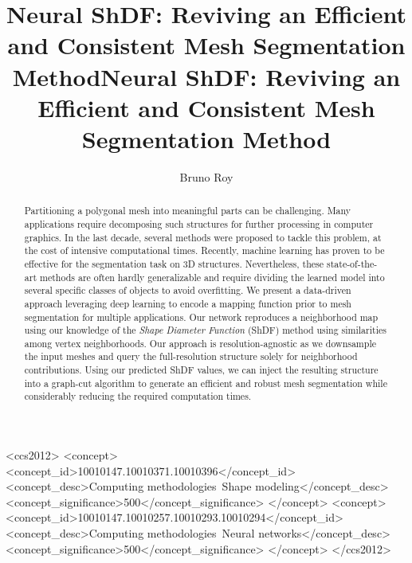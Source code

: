 \title{Neural ShDF: Reviving an Efficient and Consistent Mesh Segmentation Method}



\title{Neural ShDF: Reviving an Efficient and Consistent Mesh Segmentation Method}

\author{Bruno Roy}

\begin{abstract}
Partitioning a polygonal mesh into meaningful parts can be challenging. Many applications require decomposing such structures for further processing in computer graphics. In the last decade, several methods were proposed to tackle this problem, at the cost of intensive computational times. Recently, machine learning has proven to be effective for the segmentation task on 3D structures. Nevertheless, these state-of-the-art methods are often hardly generalizable and require dividing the learned model into several specific classes of objects to avoid overfitting. We present a data-driven approach leveraging deep learning to encode a mapping function prior to mesh segmentation for multiple applications. Our network reproduces a neighborhood map using our knowledge of the \textsl{Shape Diameter Function} (ShDF) method using similarities among vertex neighborhoods. Our approach is resolution-agnostic as we downsample the input meshes and query the full-resolution structure solely for neighborhood contributions. Using our predicted ShDF values, we can inject the resulting structure into a graph-cut algorithm to generate an efficient and robust mesh segmentation while considerably reducing the required computation times.
\end{abstract}

\begin{CCSXML}
<ccs2012>
   <concept>
       <concept_id>10010147.10010371.10010396</concept_id>
       <concept_desc>Computing methodologies~Shape modeling</concept_desc>
       <concept_significance>500</concept_significance>
       </concept>
   <concept>
       <concept_id>10010147.10010257.10010293.10010294</concept_id>
       <concept_desc>Computing methodologies~Neural networks</concept_desc>
       <concept_significance>500</concept_significance>
       </concept>
 </ccs2012>
\end{CCSXML}


